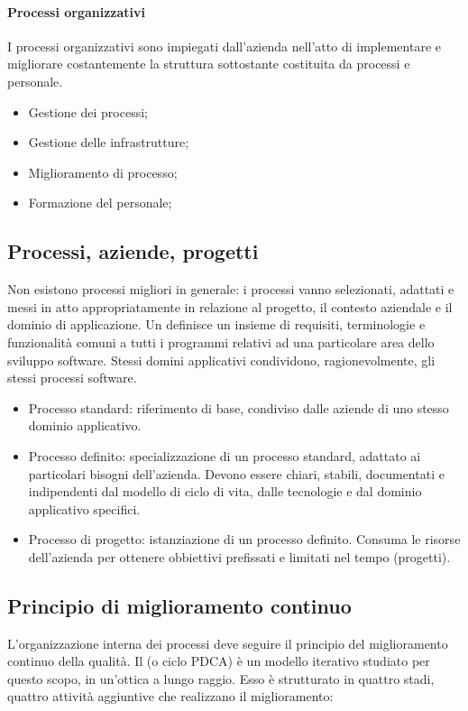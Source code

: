 \paragraph{Processi organizzativi}
I processi organizzativi sono impiegati dall'azienda nell'atto di implementare e migliorare costantemente la struttura sottostante costituita da processi e personale.

\begin{itemize}
	\item Gestione dei processi;
	\item Gestione delle infrastrutture;
	\item Miglioramento di processo;
	\item Formazione del personale;
\end{itemize}

\subsection{Processi, aziende, progetti}
Non esistono processi migliori in generale: i processi vanno selezionati, adattati e messi in atto appropriatamente in relazione al progetto, il contesto aziendale e il dominio di applicazione. Un  definisce un insieme di requisiti, terminologie e funzionalità comuni a tutti i programmi relativi ad una particolare area dello sviluppo software. Stessi domini applicativi condividono, ragionevolmente, gli stessi processi software.

\begin{itemize}
	\item Processo standard: riferimento di base, condiviso dalle aziende di uno stesso dominio applicativo.
	\item Processo definito: specializzazione di un processo standard, adattato ai particolari bisogni dell'azienda. Devono essere chiari, stabili, documentati e indipendenti dal modello di ciclo di vita, dalle tecnologie e dal dominio applicativo specifici.
	\item Processo di progetto: istanziazione di un processo definito. Consuma le risorse dell'azienda per ottenere obbiettivi prefissati e limitati nel tempo (progetti).
\end{itemize}

\subsection{Principio di miglioramento continuo}
L'organizzazione interna dei processi deve seguire il principio del miglioramento continuo della qualità. Il  (o ciclo PDCA) è un modello iterativo studiato per questo scopo, in un'ottica a lungo raggio. Esso è strutturato in quattro stadi, quattro attività aggiuntive che realizzano il miglioramento:

